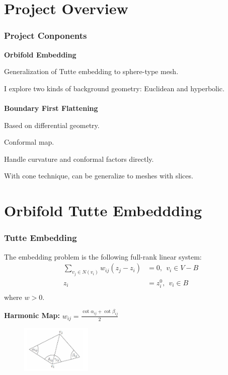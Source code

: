 \documentclass{beamer}
\begin{document}
\section{Project Overview} %
\begin{frame}
\frametitle{Project Conponents}
\textbf{Orbifold Embedding} 

Generalization of Tutte embedding to sphere-type mesh. 

I explore two kinds of background geometry: Euclidean and hyperbolic.
~\\
~\\
\textbf{Boundary First Flattening}

Based on differential geometry.

Conformal map. 

Handle curvature and conformal factors directly.

With cone technique, can be generalize to meshes with slices.
  
\end{frame}


\section{Orbifold Tutte Embeddding} %


\begin{frame}
\frametitle{Tutte Embedding}
The embedding problem is the following full-rank linear system:
\begin{equation}
\begin{split}
\sum_{v_j \in \mathit{N}(v_i)} w_{ij}(z_j-z_i) &= 0, \ \  v_i \in V - B\\
z_i &= z_i^0, \ \ v_i \in B\\
\end{split}
\label{eq:tutte}
\nonumber
\end{equation}
where $w > 0$.

\textbf{Harmonic Map:} $w_{ij} = \frac{\cot \alpha_{ij} + \cot \beta_{ij}}{2}$ 

\begin{figure}
\centering
\includegraphics[width = 0.3\textwidth]{images/harmonic}
\end{figure}

\end{frame}
\end{document}
